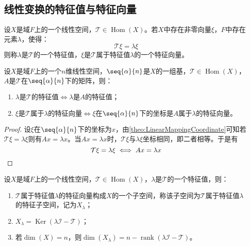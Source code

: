 \subsection{线性变换的特征值与特征向量}
\begin{definition}
	设$X$是域$F$上的一个线性空间，$\mathcal{T}\in\operatorname{Hom}(X)$。若$X$中存在非零向量$\xi$，$F$中存在元素$\lambda$，使得：
	\begin{equation*}
		\mathcal{T}\xi=\lambda\xi
	\end{equation*}
	则称$\lambda$是$\mathcal{T}$的一个特征值，$\xi$是$\mathcal{T}$属于特征值$\lambda$的一个特征向量。
\end{definition}
\begin{theorem}\label{theo:LinearlyTransformationEigen}
	设$X$是域$F$上的一个$n$维线性空间，$\seq{\alpha}{n}$是$X$的一组基，$\mathcal{T}\in\operatorname{Hom}(X)$，$A$是$\mathcal{T}$在$\seq{\alpha}{n}$下的矩阵，则：
	\begin{enumerate}
		\item $\lambda$是$\mathcal{T}$的特征值$\iff\lambda$是$A$的特征值；
		\item $\xi$是$\mathcal{T}$属于$\lambda$的特征向量$\iff \xi$在$\seq{\alpha}{n}$下的坐标是$A$属于$\lambda$的特征向量。
	\end{enumerate}
\end{theorem}
\begin{proof}
	设$\xi$在$\seq{\alpha}{n}$下的坐标为$x$，由\cref{theo:LinearMappingCoordinate}可知若$\mathcal{T}\xi=\lambda\xi$则有$Ax=\lambda x$。当$Ax=\lambda x$时，$\mathcal{T}\xi$与$\lambda\xi$坐标相同，即二者相等。于是有
	\begin{equation*}
		\mathcal{T}\xi=\lambda\xi\iff Ax=\lambda x\qedhere
	\end{equation*}
\end{proof}
\begin{property}
	设$X$是域$F$上的一个线性空间，$\mathcal{T}\in\operatorname{Hom}(X)$，$\lambda$是$\mathcal{T}$的一个特征值，则：
	\begin{enumerate}
		\item $\mathcal{T}$属于特征值$\lambda$的特征向量构成$X$的一个子空间，称该子空间为$\mathcal{T}$属于特征值$\lambda$的特征子空间，记为$X_{\lambda}$；
		\item $X_{\lambda}=\operatorname{Ker}(\lambda\mathcal{I}-\mathcal{T})$；
		\item 若$\dim(X)=n$，则$\dim(X_{\lambda})=n-\operatorname{rank}(\lambda\mathcal{I}-\mathcal{T})$。
	\end{enumerate}
\end{property}
